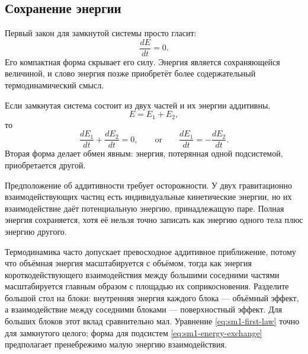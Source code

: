 \subsection{Сохранение энергии}

Первый закон для замкнутой системы просто гласит:
\begin{equation}
 \frac{dE}{dt}=0.
 \label{eq:sm1-first-law}
\end{equation}
Его компактная форма скрывает его силу. Энергия является сохраняющейся величиной, и слово энергия позже приобретёт более содержательный термодинамический смысл.

Если замкнутая система состоит из двух частей и их энергии аддитивны,
\begin{equation}
 E=E_1+E_2,
\end{equation}
то
\begin{equation}
 \frac{dE_1}{dt}+\frac{dE_2}{dt}=0,
 \qquad\text{or}\qquad
 \frac{dE_1}{dt}=-\frac{dE_2}{dt}.
 \label{eq:sm1-energy-exchange}
\end{equation}
Вторая форма делает обмен явным: энергия, потерянная одной подсистемой, приобретается другой.

Предположение об аддитивности требует осторожности. У двух гравитационно взаимодействующих частиц есть индивидуальные кинетические энергии, но их взаимодействие даёт потенциальную энергию, принадлежащую паре. Полная энергия сохраняется, хотя её нельзя точно записать как энергию одного тела плюс энергию другого.

Термодинамика часто допускает превосходное аддитивное приближение, потому что объёмная энергия масштабируется с объёмом, тогда как энергия короткодействующего взаимодействия между большими соседними частями масштабируется главным образом с площадью их соприкосновения. Разделите большой стол на блоки: внутренняя энергия каждого блока — объёмный эффект, а взаимодействие между соседними блоками — поверхностный эффект. Для больших блоков этот вклад сравнительно мал. Уравнение
\eqref{eq:sm1-first-law} точно для замкнутого целого; форма для подсистем
\eqref{eq:sm1-energy-exchange} предполагает пренебрежимо малую энергию взаимодействия.

\begin{classroomqa}
\end{classroomqa}

